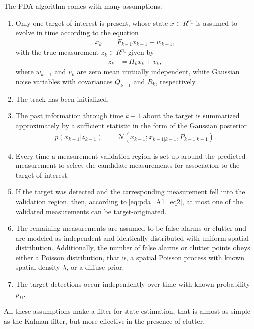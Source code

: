 The PDA algorithm comes with many assumptions:
\begin{enumerate}
    \item Only one target of interest is present, whose state $x \in R^{n_x}$ is assumed to evolve in time according to the equation
        \begin{align}
            x_k &= F_{k-1} x_{k-1} + w_{k-1},
        \end{align}
        with the true measurement $z_k \in R^{n_z}$ given by
        \begin{align}
            \label{eq:pda_A1_eq2}
            z_k &= H_k x_k + v_k,
        \end{align}
        where $w_{k-1}$ and $v_k$ are zero mean mutually independent, white Gaussian noise variables with covariances $Q_{k-1}$ and $R_k$, respectively.
    \item The track has been initialized.
    \item The past information through time $k-1$ about the target is summarized approximately by a sufficient statistic in the form of the Gaussian posterior
        \begin{align}
            p(x_{k-1}|z_{k-1}) &= \mathcal{N}(x_{k-1}; x_{k-1|k-1}, P_{k-1|k-1}). \label{eq:pda_A3}
        \end{align}
    \item Every time a measurement validation region is set up around the predicted measurement to select the candidate measurements for association to the target of interest.
    \item If the target was detected and the corresponding
    measurement fell into the validation region, then,
    according to \eqref{eq:pda_A1_eq2}, at most one of the validated measurements can be target-originated.
    \item The remaining measurements are assumed to be false alarms or clutter and are modeled as independent and identically distributed with uniform spatial distribution. Additionally, the number of false alarms or clutter points obeys either a Poisson distribution, that is, a spatial Poisson process with known
    spatial density $\lambda$, or a diffuse prior.
    \item The target detections occur independently over time
    with known probability $p_D$.
\end{enumerate}
All these assumptions make a filter for state estimation, that is almost as simple as the Kalman filter, but more effective in the presence of clutter.

